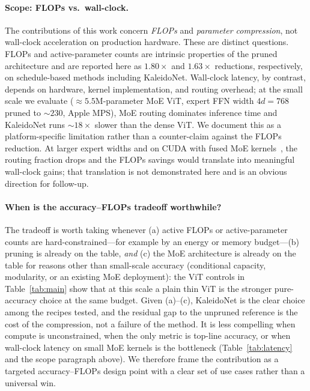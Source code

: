 \documentclass[fleqn,10pt]{article}
\begin{document}
\paragraph{Scope: FLOPs vs.\ wall-clock.}
The contributions of this work concern \emph{FLOPs} and \emph{parameter
compression}, not wall-clock acceleration on production hardware.
These are distinct questions. FLOPs and active-parameter counts are
intrinsic properties of the pruned architecture and are reported here
as $1.80\times$ and $1.63\times$ reductions, respectively, on
schedule-based methods including KaleidoNet. Wall-clock latency, by
contrast, depends on hardware, kernel implementation, and routing
overhead; at the small scale we evaluate (${\approx}5.5$M-parameter MoE ViT,
expert FFN width $4d{=}768$ pruned to $\sim\!230$, Apple MPS), MoE
routing dominates inference time and KaleidoNet runs $\sim\!18\times$
slower than the dense ViT. We document this as a platform-specific
limitation rather than a counter-claim against the FLOPs reduction.
At larger expert widths and on CUDA with fused MoE
kernels~\citep{gale2023megablocks}, the routing fraction drops and
the FLOPs savings would translate into meaningful wall-clock gains;
that translation is not demonstrated here and is an obvious direction
for follow-up.

\paragraph{When is the accuracy--FLOPs tradeoff worthwhile?}
The tradeoff is worth taking whenever (a) active FLOPs or
active-parameter counts are hard-constrained---for example by an
energy or memory budget---(b) pruning is already on the
table, \emph{and} (c) the MoE architecture is already on the table
for reasons other than small-scale accuracy (conditional capacity,
modularity, or an existing MoE deployment): the ViT controls in
Table~\ref{tab:main} show that at this scale a plain thin ViT is
the stronger pure-accuracy choice at the same budget. Given
(a)--(c), KaleidoNet is the clear choice among the recipes tested,
and the residual gap to the unpruned reference is the cost of the
compression, not a failure of the method. It is less compelling when compute is
unconstrained, when the only metric is top-line accuracy, or when
wall-clock latency on small MoE kernels is the bottleneck
(Table~\ref{tab:latency} and the scope paragraph above). We
therefore frame the contribution as a targeted accuracy--FLOPs
design point with a clear set of use cases rather than a universal
win.
\end{document}
